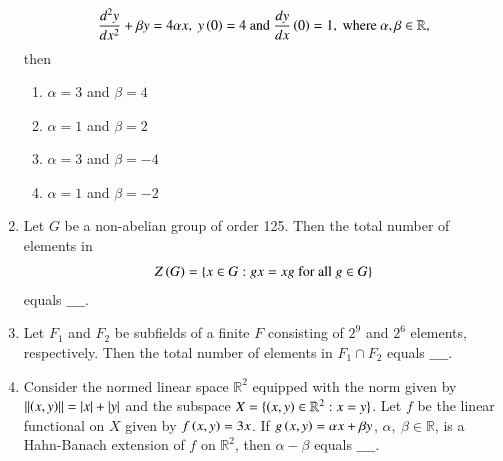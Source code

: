 \documentclass[journal]{IEEEtran}
\begin{document}
\begin{enumerate}
\begin{align*}
    \frac{d^2y}{dx^2} + \beta y = 4 \alpha x,\ y\brak{0} = 4\ \text{and}\ \frac{dy}{dx}\brak{0} = 1,\ \text{where}\ \alpha, \beta \in \mathbb{R},
\end{align*}
 then
  \begin{enumerate}
   \item $\alpha = 3$ and $\beta = 4$
   \item $\alpha = 1$ and $\beta = 2$
   \item $\alpha = 3$ and $\beta = -4$
   \item $\alpha = 1$ and $\beta = -2$ \\
\end{enumerate}
\item Let $G$ be a non-abelian group of order 125. Then the total number of elements in 
\begin{align*}
    Z\left(G\right) = \{x \in G : gx = xg \text{ for all } g \in G\}
\end{align*}
equals $\_\_\_\_$. \\
\item Let $F_1$ and $F_2$ be subfields of a finite $F$ consisting of $2^9$ and $2^6$ elements, respectively. Then the total number of elements in $F_1 \cap F_2$ equals $\_\_\_\_$. \\
\item Consider the normed linear space $\mathbb{R}^2$ equipped with the norm given by $\left\vert\left\vert\left(x, y\right)\right\vert\right\vert = \left\vert x\right\vert + \left\vert y\right\vert$ and the subspace $X = \{\left(x, y\right) \in \mathbb{R}^2 : x = y \}$. Let $f$ be the linear functional on $X$ given by $f\left(x, y\right) = 3x$. If $g\left(x, y\right) = \alpha x + \beta y$, $\alpha,\ \beta \in \mathbb{R}$, is a Hahn-Banach extension of $f$ on $\mathbb{R}^2$, then $\alpha - \beta$ equals $\_\_\_\_$. \\
			 \end{enumerate}
			 
\end{document}
